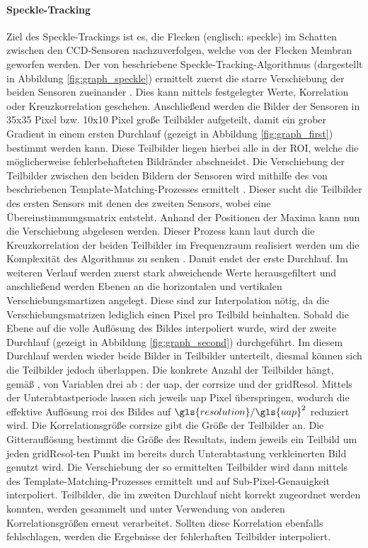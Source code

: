\paragraph{Speckle-Tracking}
\label{sec:speckle-tracking}
Ziel des Speckle-Trackings ist es, die Flecken (englisch: speckle) im Schatten zwischen den \gls{CCD}-Sensoren nachzuverfolgen, welche von der Flecken Membran geworfen werden. 
Der von \citeauthor{Ber13} beschriebene Speckle-Tracking-Algorithmus (dargestellt in Abbildung \ref{fig:graph_speckle}) ermittelt zuerst die starre Verschiebung der beiden Sensoren zueinander . Dies kann mittels festgelegter Werte, Korrelation oder Kreuzkorrelation geschehen. Anschließend werden die Bilder der Sensoren in 35x35 Pixel bzw. 10x10 Pixel große Teilbilder aufgeteilt, damit ein grober Gradient in einem ersten Durchlauf (gezeigt in Abbildung \ref{fig:graph_first}) bestimmt werden kann. Diese Teilbilder liegen hierbei alle in der \gls{ROI}, welche die möglicherweise fehlerbehafteten Bildränder abschneidet. Die Verschiebung der Teilbilder zwischen den beiden Bildern der Sensoren wird mithilfe des von \citeauthor{Lew94} beschriebenen Template-Matching-Prozesses ermittelt \cite{Lew94}. Dieser sucht die Teilbilder des ersten Sensors mit denen des zweiten Sensors, wobei eine Übereinstimmungsmatrix entsteht. Anhand der Positionen der Maxima kann nun die Verschiebung abgelesen werden. Dieser Prozess kann laut \citeauthor{Lew94} durch die Kreuzkorrelation der beiden Teilbilder im Frequenzraum realisiert werden um die Komplexität des Algorithmus zu senken \cite{Lew94}. Damit endet der erste Durchlauf. 
Im weiteren Verlauf werden zuerst stark abweichende Werte herausgefiltert und anschließend werden Ebenen an die horizontalen und vertikalen Verschiebungsmartizen angelegt. Diese sind zur Interpolation nötig, da die Verschiebungsmatrizen lediglich einen Pixel pro Teilbild beinhalten. Sobald die Ebene auf die volle Auflösung des Bildes interpoliert wurde, wird der zweite Durchlauf (gezeigt in Abbildung \ref{fig:graph_second}) durchgeführt. Im diesem Durchlauf werden wieder beide Bilder in Teilbilder unterteilt, diesmal können sich die Teilbilder jedoch überlappen. Die konkrete Anzahl der Teilbilder hängt, gemäß \citeauthor{Coj17}, von Variablen drei ab \cite{Coj17}: der \gls{uap}, der \gls{corrsize} und der \gls{gridResol}. Mittels der Unterabtastperiode lassen sich jeweils \gls{uap} Pixel überspringen, wodurch die effektive Auflösung \gls{rroi} des Bildes auf $\gls{resolution}/\gls{uap}^2$ reduziert wird. Die Korrelationsgröße \gls{corrsize} gibt die Größe der Teilbilder an. Die Gitterauflösung bestimmt die Größe des Resultats, indem jeweils ein Teilbild um jeden \gls{gridResol}-ten Punkt im bereits durch Unterabtastung verkleinerten Bild genutzt wird. 
Die Verschiebung der so ermittelten Teilbilder wird dann mittels des Template-Matching-Prozesses ermittelt und auf Sub-Pixel-Genauigkeit interpoliert. 
Teilbilder, die im zweiten Durchlauf nicht korrekt zugeordnet werden konnten, werden gesammelt und unter Verwendung von anderen Korrelationsgrößen erneut verarbeitet. Sollten diese Korrelation ebenfalls fehlschlagen, werden die Ergebnisse der fehlerhaften Teilbilder interpoliert. 


